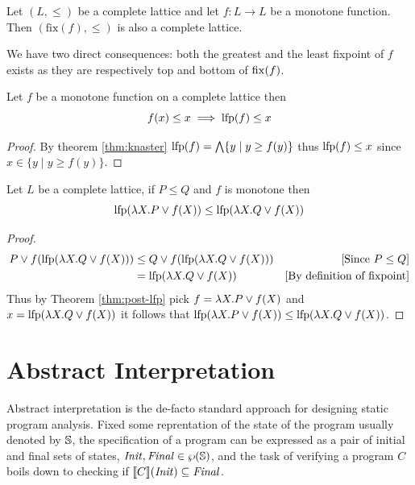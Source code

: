 \documentclass[
  10pt,       %
  twoside,    %
  a4paper,    %
  english,    %
  tikz,       %
  openright,  %
]{book}
\begin{document}
\begin{theorem}
  \label{thm:knaster}
  Let $(L, \leq)$ be a complete lattice and let $f : L \to L$ be a monotone 
  function. Then $(\text{fix}(f), \leq)$ is also a complete lattice.
\end{theorem}

We have two direct consequences: both the greatest and the least fixpoint of
$f$ exists as they are respectively top and bottom of $\mathrm{fix}(f)$.

\begin{theorem}
  \label{thm:post-lfp}
  Let $f$ be a monotone function on a complete lattice then
  $$f(x) \leq x \implies \mathrm{lfp}(f) \leq x$$
\end{theorem}
\begin{proof}
  By theorem \ref{thm:knaster} $\mathrm{lfp}(f) = \bigwedge\{ y \mid y \geq f(y) \}$
  thus $\mathrm{lfp}(f) \leq x$ since $x \in \{ y \mid y \geq f(y) \}$.
\end{proof}

\begin{theorem}
  \label{thm:lfp-mono}
  Let $L$ be a complete lattice, if $P \leq Q$ and $f$ is monotone then
  $$\mathrm{lfp}(\lambda X. P \lor f(X)) \leq \mathrm{lfp}(\lambda X. Q \lor f(X))$$
\end{theorem}
\begin{proof}
  \begin{align*}
    P \lor f(\mathrm{lfp}(\lambda X . Q \lor f(X)))
      &\leq Q \lor f(\mathrm{lfp}(\lambda X . Q \lor f(X)))
      &\text{[Since $P \leq Q$]} \\
      &= \mathrm{lfp}(\lambda X . Q \lor f(X))
      &\text{[By definition of fixpoint]} \\
  \end{align*}
  Thus by Theorem \ref{thm:post-lfp} pick $f = \lambda X . P \lor f(X)$ and
  $x = \mathrm{lfp}(\lambda X. Q \lor f(X))$ it follows that
  $\mathrm{lfp}(\lambda X. P \lor f(X)) \leq \mathrm{lfp}(\lambda X. Q \lor f(X))$.
\end{proof}

\section{Abstract Interpretation}

Abstract interpretation \cite{Cousot77, Cousot21} is the de-facto standard
approach for designing static program analysis. Fixed some reprentation of the
state of the program usually denoted by $\mathbb{S}$, the specification of a
program can be expressed as a pair of initial and final sets of states,
$\mathit{Init}, \mathit{Final} \in \wp(\mathbb{S})$, and the task of verifying a
program $C$ boils down to checking if $\llbracket C \rrbracket(\mathit{Init}) \subseteq
\mathit{Final}$.
\end{document}
